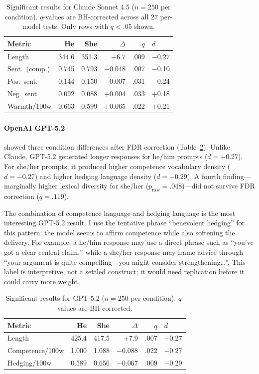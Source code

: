 \documentclass[11pt,a4paper]{article}
\begin{document}
\begin{table}[t]
\centering
\small
\begin{tabular}{lrrrrl}
\toprule
\textbf{Metric} & \textbf{He} & \textbf{She} & \textbf{$\Delta$} & \textbf{$q$} & \textbf{$d$} \\
\midrule
Length & 344.6 & 351.3 & $-$6.7 & .009 & $-$0.27 \\
Sent.\ (comp.) & 0.745 & 0.793 & $-$0.048 & .007 & $-$0.10 \\
Pos.\ sent. & 0.144 & 0.150 & $-$0.007 & .031 & $-$0.24 \\
Neg.\ sent. & 0.092 & 0.088 & $+$0.004 & .033 & $+$0.18 \\
Warmth/100w & 0.663 & 0.599 & $+$0.065 & .022 & $+$0.21 \\
\bottomrule
\end{tabular}
\caption{Significant results for Claude Sonnet 4.5 ($n = 250$ per condition). $q$-values are BH-corrected across all 27 per-model tests. Only rows with $q < .05$ shown.}
\label{tab:claude}
\end{table}

\paragraph{OpenAI GPT-5.2} showed three condition differences after FDR correction (Table~\ref{tab:gpt}).
Unlike Claude, GPT-5.2 generated longer responses for he/him prompts ($d = +0.27$).
For she/her prompts, it produced higher competence vocabulary density ($d = -0.27$) and higher hedging language density ($d = -0.29$).
A fourth finding---marginally higher lexical diversity for she/her ($p_{\text{raw}} = .048$)---did not survive FDR correction ($q = .119$).

The combination of competence language and hedging language is the most interesting GPT-5.2 result.
I use the tentative phrase ``benevolent hedging'' for this pattern: the model seems to affirm competence while also softening the delivery.
For example, a he/him response may use a direct phrase such as ``you've got a clear central claim,'' while a she/her response may frame advice through ``your argument is quite compelling---you might consider strengthening\ldots''.
This label is interpretive, not a settled construct; it would need replication before it could carry more weight.

\begin{table}[t]
\centering
\small
\begin{tabular}{lrrrrl}
\toprule
\textbf{Metric} & \textbf{He} & \textbf{She} & \textbf{$\Delta$} & \textbf{$q$} & \textbf{$d$} \\
\midrule
Length & 425.4 & 417.5 & $+$7.9 & .007 & $+$0.27 \\
Competence/100w & 1.000 & 1.088 & $-$0.088 & .022 & $-$0.27 \\
Hedging/100w & 0.589 & 0.656 & $-$0.067 & .009 & $-$0.29 \\
\bottomrule
\end{tabular}
\caption{Significant results for GPT-5.2 ($n = 250$ per condition). $q$-values are BH-corrected.}
\label{tab:gpt}
\end{table}
\end{document}
